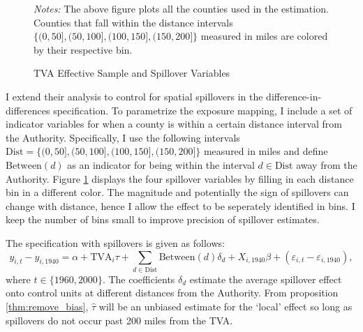 \documentclass[11pt]{article}
\begin{document}
\begin{figure}[tb!]
    \caption{TVA Effective Sample and Spillover Variables}
    \label{fig:tva_sample}

    {\centering
    }

    {\footnotesize \textit{Notes:} The above figure plots all the counties used in the estimation. Counties that fall within the distance intervals $\{ (0, 50], (50, 100], (100, 150], (150, 200] \}$ measured in miles are colored by their respective bin.} 
\end{figure}

I extend their analysis to control for spatial spillovers in the difference-in-differences specification. To parametrize the exposure mapping, I include a set of indicator variables for when a county is within a certain distance interval from the Authority. Specifically, I use the following intervals $\text{Dist} = \{(0, 50], (50, 100], (100, 150], (150, 200]\}$ measured in miles and define $\text{Between}(d)$ as an indicator for being within the interval $d \in \text{Dist}$ away from the Authority. Figure \ref{fig:tva_sample} displays the four spillover variables by filling in each distance bin in a different color. The magnitude and potentially the sign of spillovers can change with distance, hence I allow the effect to be seperately identified in bins. I keep the number of bins small to improve precision of spillover estimates. 

The specification with spillovers is given as follows:  
\begin{equation}\label{eq:tva_spillover}
    y_{i, t} - y_{i, 1940} = \alpha + \text{TVA}_i \tau + \sum_{d \in \text{Dist}} \text{Between}(d)\delta_d + X_{i, 1940} \beta + (\varepsilon_{i, t} - \varepsilon_{i, 1940}),
\end{equation} 
where $t \in \{1960, 2000\}$. The coefficients $\delta_d$ estimate the average spillover effect onto control units at different distances from the Authority. From proposition \ref{thm:remove_bias}, $\hat{\tau}$ will be an unbiased estimate for the `local' effect so long as spillovers do not occur past 200 miles from the TVA.
\end{document}
